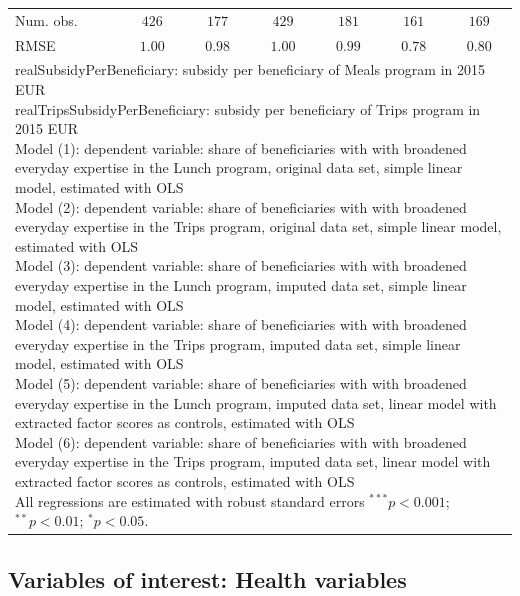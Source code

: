 \documentclass[12pt, a4paper, titlepage]{article}\usepackage[]{graphicx}\usepackage[]{color}
\begin{document}
\begin{table}
\begin{center}
{\begin{tabular}{l c c c c c c}
Num. obs.                      & $426$    & $177$    & $429$    & $181$    & $161$        & $169$        \\
RMSE                           & $1.00$   & $0.98$   & $1.00$   & $0.99$   & $0.78$       & $0.80$       \\
\hline
\multicolumn{7}{l}{\scriptsize{\parbox{\linewidth}
{\vspace{2pt} realSubsidyPerBeneficiary: subsidy per beneficiary of Meals program in 2015 EUR \\ realTripsSubsidyPerBeneficiary: subsidy per beneficiary of Trips program in 2015 EUR \\ Model (1): dependent variable: share of beneficiaries with with broadened everyday expertise in the Lunch program, original data set, simple linear model, estimated with OLS \\ Model (2): dependent variable: share of beneficiaries with with broadened everyday expertise in the Trips program, original data set, simple linear model, estimated with OLS \\ Model (3): dependent variable: share of beneficiaries with with broadened everyday expertise in the Lunch program, imputed data set, simple linear model, estimated with OLS \\ Model (4): dependent variable: share of beneficiaries with with broadened everyday expertise in the Trips program, imputed data set, simple linear model, estimated with OLS\\ Model (5): dependent variable: share of beneficiaries with with broadened everyday expertise in the Lunch program, imputed data set, linear model with extracted factor scores as controls, estimated with OLS \\ Model (6): dependent variable: share of beneficiaries with with broadened everyday expertise in the Trips program, imputed data set, linear model with extracted factor scores as controls, estimated with OLS \\ All regressions are estimated with robust standard errors $^{***}p<0.001$; $^{**}p<0.01$; $^{*}p<0.05$.}}}
\end{tabular}
}
\label{DayToDaySkillsRegressions}
\end{center}
\end{table}


\subsection{Variables of interest: Health variables} 
\end{document}
